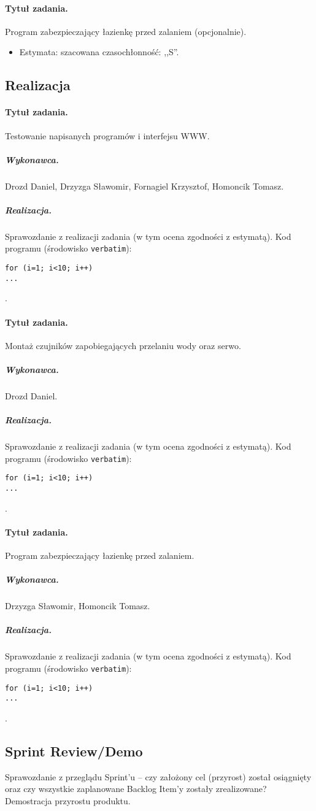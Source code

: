 \paragraph{Tytuł zadania.} Program zabezpieczający łazienkę przed zalaniem (opcjonalnie).
\begin{itemize}
	\item Estymata: szacowana czasochłonność: ,,S''.
\end{itemize}


\subsection{Realizacja}

\paragraph{Tytuł zadania.} Testowanie napisanych programów i interfejsu WWW.
\subparagraph{Wykonawca.} Drozd Daniel, Drzyzga Sławomir, Fornagiel Krzysztof, Homoncik Tomasz.
\subparagraph{Realizacja.} Sprawozdanie z realizacji zadania (w tym ocena zgodności z estymatą). Kod programu (środowisko \texttt{verbatim}): \begin{verbatim}
for (i=1; i<10; i++)
...
\end{verbatim}.

\paragraph{Tytuł zadania.} Montaż czujników zapobiegających przelaniu wody oraz serwo.
\subparagraph{Wykonawca.} Drozd Daniel.
\subparagraph{Realizacja.} Sprawozdanie z realizacji zadania (w tym ocena zgodności z estymatą). Kod programu (środowisko \texttt{verbatim}): \begin{verbatim}
for (i=1; i<10; i++)
...
\end{verbatim}.

\paragraph{Tytuł zadania.} Program zabezpieczający łazienkę przed zalaniem.
\subparagraph{Wykonawca.} Drzyzga Sławomir, Homoncik Tomasz.
\subparagraph{Realizacja.} Sprawozdanie z realizacji zadania (w tym ocena zgodności z estymatą). Kod programu (środowisko \texttt{verbatim}): \begin{verbatim}
for (i=1; i<10; i++)
...
\end{verbatim}.


\subsection{Sprint Review/Demo}
Sprawozdanie z przeglądu Sprint'u -- czy założony cel (przyrost) został osiągnięty oraz czy wszystkie zaplanowane Backlog Item'y zostały zrealizowane? Demostracja przyrostu produktu.
